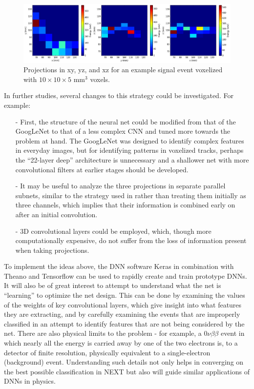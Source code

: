 \documentclass[11pt,a4paper]{article}
\begin{document}
\begin{figure}[!htb]
	\centering
	\includegraphics[scale=0.4]{fig/plt_h2D_dnn_NEXT100_0vbb_si_v10x10x5_r200x200x200_6_si.png}
	\caption{\label{fig.projs10105}Projections in xy, yz, and xz for an example signal event voxelized with $10 \times 10 \times 5$ mm$^3$ voxels.}
\end{figure}

In further studies, several changes to this strategy could be investigated. For example:

\begin{enumerate}[itemsep=-1mm]
	\item[-] First, the structure of the neural net could be modified from that of the GoogLeNet to that of a less complex CNN and tuned more towards the problem at hand. The GoogLeNet was designed to identify complex features in everyday images, but for identifying patterns in voxelized tracks, perhaps the ``22-layer deep'' architecture is unnecessary and a shallower net with more convolutional filters at earlier stages should be developed. 
	\item[-] It may be useful to analyze the three projections in separate parallel subnets, similar to the strategy used in \cite{Aurisano_2016} rather than treating them initially as three channels, which implies that their information is combined early on after an initial convolution. 
	\item[-] 3D convolutional layers could be employed, which, though more computationally expensive, do not suffer from the loss of information present when taking projections.
\end{enumerate}

To implement the ideas above, the DNN software Keras \cite{Keras} in combination with Theano \cite{Theano} and Tensorflow \cite{Tensorflow} can be used to rapidly create and train prototype DNNs. It will also be of great interest to attempt to understand what the net is ``learning'' to optimize the net design. This can be done by examining the values of the weights of key convolutional layers, which give insight into what features they are extracting, and by carefully examining the events that are improperly classified in an attempt to identify features that are not being considered by the net. There are also physical limits to the problem - for example, a $0\nu\beta\beta$ event in which nearly all the energy is carried away by one of the two electrons is, to a detector of finite resolution, physically equivalent to a single-electron (background) event. Understanding such details not only helps in converging on the best possible classification in NEXT but also will guide similar applications of DNNs in physics.
\end{document}
